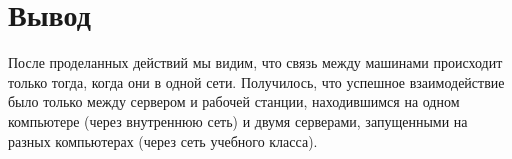 \documentclass[a4paper,12pt]{article}
\begin{document}
\section*{Вывод}

После проделанных действий мы видим, что связь между машинами происходит только тогда, 
когда они в одной сети. Получилось, что успешное взаимодействие было только между сервером и
рабочей станции, находившимся на одном компьютере (через внутреннюю сеть) и двумя серверами, 
запущенными на разных компьютерах (через сеть учебного класса).
\end{document}
